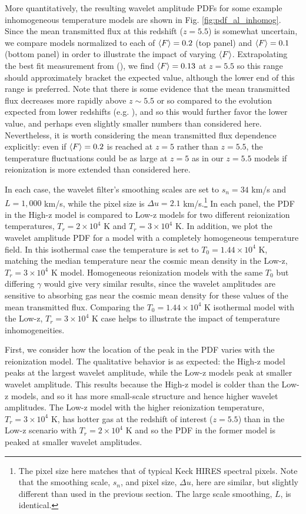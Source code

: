More quantitatively, the resulting wavelet amplitude PDFs for some example inhomogeneous temperature models are shown in Fig. \ref{fig:pdf_al_inhomog}. Since the 
mean transmitted flux at this redshift ($z=5.5$) is somewhat uncertain, we compare models normalized to each of $\langle F \rangle=0.2$ (top panel) and $\langle F \rangle=0.1$ (bottom panel) in order
to illustrate the impact of varying $\langle F \rangle$. Extrapolating the best fit measurement from (\citealt{Becker:2012aq}), we find
$\langle F \rangle=0.13$ at $z=5.5$ so this range should approximately bracket the expected value, although the lower end of this range
is preferred. Note that there is some evidence that the mean transmitted flux decreases more rapidly above $z \sim 5.5$ or so compared to the evolution
expected from lower redshifts (e.g. \citealt{Fan:2005es}), and so this would
further favor the lower value, and perhaps even slightly smaller numbers than considered here. Nevertheless, it is worth considering the mean transmitted
flux dependence explicitly: even if $\langle F \rangle=0.2$ is reached at $z=5$ rather than $z=5.5$, the temperature fluctuations could be as large at $z=5$ as in our
$z=5.5$ models if reionization is more extended than considered here. 

In each case, the wavelet filter's smoothing scales are set to $s_n = 34$ km/s and $L=1,000$ km/s, while
the pixel size is $\Delta u = 2.1$ km/s.\footnote{The pixel size here matches that of typical Keck HIRES spectral pixels. Note that the smoothing scale, $s_n$, and pixel size, $\Delta u$, here are similar, but slightly different than used
in the previous section. The large scale smoothing, $L$, is identical.} In each panel, the PDF in the High-z model is compared to Low-z models for
two different reionization temperatures, $T_r = 2 \times 10^4$ K and $T_r = 3 \times 10^4$ K. In addition, we plot the wavelet amplitude PDF for a model
with a completely homogeneous temperature field. In this isothermal case the temperature is set to $T_0 = 1.44 \times 10^4$ K, matching the median
temperature near the cosmic mean density in the Low-z, $T_r = 3 \times 10^4$ K model. Homogeneous reionization 
models with the same $T_0$ but differing
$\gamma$ would give very similar results, since the wavelet amplitudes 
are sensitive to absorbing gas near the cosmic mean density for these values of the mean transmitted flux.
Comparing the $T_0 = 1.44 \times 10^4$ K isothermal model with the Low-z, $T_r = 3 \times 10^4$ K case helps to illustrate the impact of temperature
inhomogeneities.

First, we consider how the location of the peak in the PDF varies with the reionization model. The qualitative behavior is as expected: the High-z model
peaks at the largest wavelet amplitude, while the Low-z models peak at smaller wavelet amplitude. This results because the High-z model is colder than
the Low-z models, and so it has more small-scale structure and hence higher wavelet amplitudes. The Low-z model with the higher reionization 
temperature, $T_r = 3 \times 10^4$ K, has hotter gas at the redshift of interest ($z=5.5$) than in the Low-z scenario with $T_r = 2 \times 10^4$ K
and so the PDF in the former model is peaked at smaller wavelet amplitudes. 

